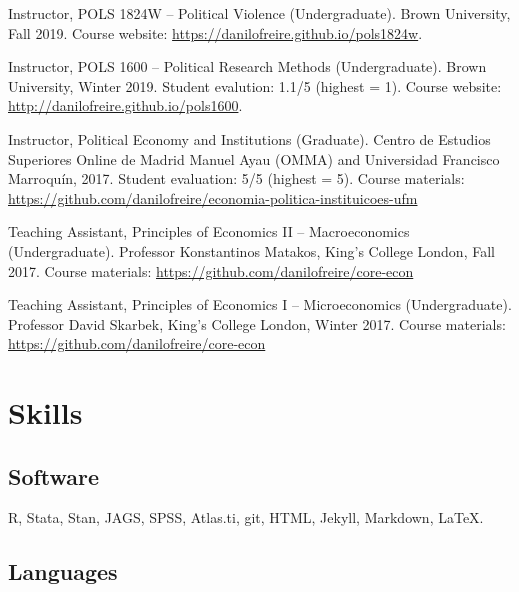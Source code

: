 \documentclass[a4paper]{article}
\renewenvironment{itemize}{
	\begin{list}{}{
			\setlength{\leftmargin}{1.5em}
		}
		}{
	\end{list}
}
\begin{document}
	\begin{itemize}
		\item Instructor, POLS 1824W -- Political Violence (Undergraduate). Brown University, Fall 2019. Course website: \href{https://danilofreire.github.io/pols1824w}{https://danilofreire.github.io/pols1824w}.
		\item Instructor, POLS 1600 -- Political Research Methods (Undergraduate). Brown University, Winter 2019. Student evalution: 1.1/5 (highest = 1). Course website: \href{https://danilofreire.github.io/pols1600}{http://danilofreire.github.io/pols1600}.
		\item Instructor, Political Economy and Institutions (Graduate). Centro de Estudios Superiores Online de Madrid Manuel Ayau (OMMA) and Universidad Francisco Marroquín, 2017. Student evaluation: 5/5 (highest = 5). Course materials: \href{https://github.com/danilofreire/economia-politica-instituicoes-ufm}{https://github.com/danilofreire/economia-politica-instituicoes-ufm}
		\item Teaching Assistant, Principles of Economics II -- Macroeconomics (Undergraduate). Professor Konstantinos Matakos, King's College London, Fall 2017. Course materials: \href{https://github.com/danilofreire/core-econ}{https://github.com/danilofreire/core-econ}
		\item Teaching Assistant, Principles of Economics I -- Microeconomics (Undergraduate). Professor David Skarbek, King's College London, Winter 2017. Course materials: \href{https://github.com/danilofreire/core-econ}{https://github.com/danilofreire/core-econ}
	\end{itemize}

	\section*{Skills}

	\subsection*{Software}

	\begin{itemize}
		\item R, Stata, Stan, JAGS, SPSS, Atlas.ti, git, HTML, Jekyll, Markdown, \LaTeX{}.
	\end{itemize}

	\subsection*{Languages}
\end{document}

